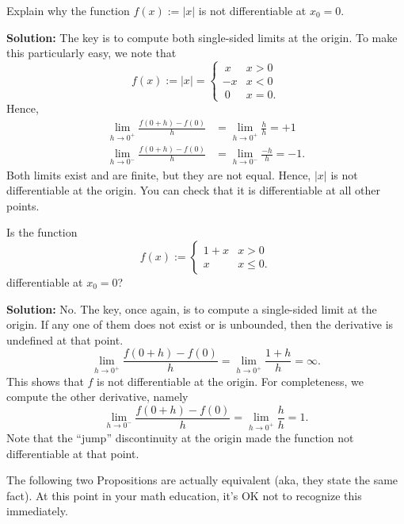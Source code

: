 \bigskip



\begin{example}
\label{ex:NonDifferentiableFunction}
Explain why the function $f(x):=|x|$ is not differentiable at $x_0=0$. 
\end{example}

\textbf{Solution:} The key is to compute both single-sided limits at the origin. To make this particularly easy, we note that
$$ f(x) := |x| = \begin{cases}
    ~x & x > 0\\
    -x & x < 0 \\
   ~ 0 & x = 0.
\end{cases}$$
Hence, 
\begin{align*}
  \lim_{h \to 0^+} \frac{f(0 + h) - f(0)}{h} & = \lim_{h \to 0^+} \frac{h}{h} = +1 \\
     \lim_{h \to 0^-} \frac{f(0 + h) - f(0)}{h} & = \lim_{h \to 0^-} \frac{-h}{h} = -1.
\end{align*}
Both limits exist and are finite, but they are not equal. Hence, $|x|$ is not differentiable at the origin. You can check that it is differentiable at all other points.

\Qed
\bigskip

\begin{example}
\label{ex:NonDifferentiableFunction02}
Is the function  $$ f(x) :=  \begin{cases}
    1 + x & x > 0\\
    x & x \le 0.
\end{cases}$$
differentiable at $x_0=0$? 
\end{example}

\textbf{Solution:} \Ans No. The key, once again, is to compute a single-sided limit at the origin. If any one of them does not exist or is unbounded, then the derivative is undefined at that point. 
$$
  \lim_{h \to 0^+} \frac{f(0 + h) - f(0)}{h} = \lim_{h \to 0^+} \frac{1+h}{h} = \infty.
$$
This shows that $f$ is not differentiable at the origin. For completeness, we compute the other derivative, namely
$$
  \lim_{h \to 0^-} \frac{f(0 + h) - f(0)}{h} = \lim_{h \to 0^+} \frac{h}{h} = 1.
$$
Note that the ``jump'' discontinuity at the origin made the function not differentiable at that point. 
\Qed

\bigskip
The following two Propositions are actually equivalent (aka, they state the same fact). At this point in your math education, it's OK not to recognize this immediately. 
\bigskip

